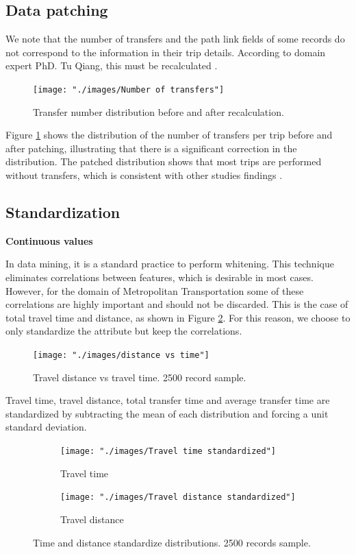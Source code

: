 \documentclass{article}
\begin{document}
\subsection{Data patching}
\label{sec:patching}
We note that the number of transfers and the path link fields of some records do not correspond to the information in their trip details. According to domain expert PhD. Tu Qiang, this must be recalculated \cite{tommy}. 

\begin{figure}[H]
  \centering
  \texttt{[image: "./images/Number of transfers"]}
  \caption{Transfer number distribution before and after recalculation.}
  \label{fig:preprocessing/num_transfers}
\end{figure}

Figure \ref{fig:preprocessing/num_transfers} shows the distribution of the number of transfers per trip before and after patching, illustrating that there is a significant correction in the distribution. The patched distribution shows that most trips are performed without transfers, which is consistent with other studies findings \cite{bhaskar2015passenger}.

\subsection{Standardization} 

\textbf{Continuous values}

In data mining, it is a standard practice to perform whitening. This technique eliminates correlations between features, which is desirable in most cases. However, for the domain of Metropolitan Transportation some of these correlations are highly important and should not be discarded. This is the case of total travel time and distance, as shown in Figure \ref{fig:preprocessing/distance_time_correlation}. For this reason, we choose to only standardize the attribute but keep the correlations. 

\begin{figure}[H]
  \centering
  \texttt{[image: "./images/distance vs time"]}
  \caption{Travel distance vs travel time. 2500 record sample.}
  \label{fig:preprocessing/distance_time_correlation}
\end{figure}

Travel time, travel distance, total transfer time and average transfer time are standardized by subtracting the mean of each distribution and forcing a unit standard deviation.

\begin{figure}[H]
  \centering
  \begin{subfigure}[b]{.45\textwidth}
  	\centering
  	\texttt{[image: "./images/Travel time standardized"]}
  	\caption{Travel time}
  \end{subfigure}
  \begin{subfigure}[b]{.45\textwidth}
  	\centering
  	\texttt{[image: "./images/Travel distance standardized"]}
  	\caption{Travel distance}
  \end{subfigure}
  \caption{Time and distance standardize distributions. 2500 records sample.}
  	\label{fig:preprocessing/timeDist}
\end{figure}
\end{document}
